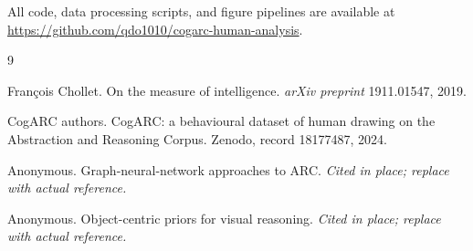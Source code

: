 \documentclass[11pt]{article}
\begin{document}
All code, data processing scripts, and figure pipelines are
available at \url{https://github.com/qdo1010/cogarc-human-analysis}.

\begin{thebibliography}{9}

Fran\c{c}ois Chollet.
\newblock On the measure of intelligence.
\newblock \emph{arXiv preprint} 1911.01547, 2019.

CogARC authors.
\newblock CogARC: a behavioural dataset of human drawing on the
         Abstraction and Reasoning Corpus.
\newblock Zenodo, record 18177487, 2024.

Anonymous.
\newblock Graph-neural-network approaches to ARC.
\newblock \emph{Cited in place; replace with actual reference.}

Anonymous.
\newblock Object-centric priors for visual reasoning.
\newblock \emph{Cited in place; replace with actual reference.}

\end{thebibliography}
\end{document}
